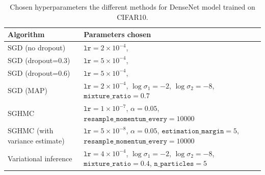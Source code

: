 \begin{table}[H]
    \centering
    \begin{tabular}{p{4cm}p{9cm}}
        \toprule
        Algorithm & Parameters chosen \\ \midrule
        SGD (no dropout) & $\texttt{lr}=2\times 10^{-4}$, \\ \midrule
        SGD (dropout=0.3) & $\texttt{lr}=5\times 10^{-4}$, \\ \midrule
        SGD (dropout=0.6) & $\texttt{lr}=5\times 10^{-4}$,  \\ \midrule
        SGD (MAP) & 
        $\texttt{lr}=2 \times 10^{-4}$, 
        $\log\sigma_1=-2$, 
        $\log\sigma_2=-8$, 
        $\texttt{mixture\_ratio}=0.7$ \\ \midrule
        SGHMC & $\texttt{lr}=1\times 10^{-7}$, $\alpha=0.05$, $\texttt{resample\_momentum\_every}=10000$ \\ \midrule
        SGHMC (with variance estimate) &  $\texttt{lr}= 5\times 10^{-8}$, 
        $\alpha=0.05$,
        $\texttt{estimation\_margin}=5$, $\texttt{resample\_momentum\_every}=10000$ \\ \midrule
        Variational inference &    
        $\texttt{lr}=4 \times 10^{-4}$,
        $\log\sigma_1=-2$,
        $\log\sigma_2=-8$,
        $\texttt{mixture\_ratio}=0.4$,
        $\texttt{n\_particles}=5$ \\
        \bottomrule
    \end{tabular}
    \caption{Chosen hyperparameters the different methods for DenseNet model trained on CIFAR10.}
    \label{tab:mnist-hparams}
\end{table}
